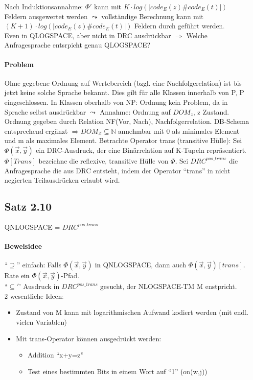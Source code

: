 \documentclass[12pt, a4paper]{article}
\begin{document}
Nach Induktionsannahme: $\Phi'$ kann mit $K \cdot log(|code_E(z)\#code_E(t)|)$ Feldern ausgewertet werden $\leadsto$ vollständige Berechnung kann mit $(K + 1) \cdot log(|code_E(z) \# code_E(t)|)$ Feldern durch geführt werden. \\

Even in QLOGSPACE, aber nicht in DRC ausdrückbar $\Rightarrow$ Welche Anfragesprache entsrpicht genau QLOGSPACE? \\

\paragraph{Problem} Ohne gegebene Ordnung auf Wertebereich (bzgl. eine Nachfolgerelation) ist bis jetzt keine solche Sprache bekannt. Dies gilt für alle Klassen innerhalb von P, P eingeschlossen. In Klassen oberhalb von NP: Ordnung kein Problem, da in Sprache selbst ausdrückbar $\leadsto$ Annahme: Ordnung auf $DOM_z$, z Zustand. \\

Ordnung gegeben durch Relation NF(Vor, Nach), Nachfolgerrelation. DB-Schema entsprechend ergänzt $\Rightarrow DOM_Z \subseteq \mathbb{N}$ annehmbar mit 0 als minimales Element und m als maximales Element. Betrachte Operator trans (transitive Hülle):
Sei $\Phi(\overset{\rightarrow}{x}, \overset{\rightarrow}{y}) $ ein DRC-Ausdruck, der eine Binärrelation auf K-Tupeln repräsentiert. $\Phi[Trans]$ bezeichne die reflexive, transitive Hülle von $\Phi$. Sei $DRC^{pos\_trans}$ die Anfragesprache die aus DRC entsteht, indem der Operator ``trans'' in nicht negierten Teilausdrücken erlaubt wird.

\subsection*{Satz 2.10}

QNLOGSPACE = $DRC^{pos\_trans}$

\paragraph{Beweisidee}

``$\supseteq$'' einfach: Falls $\Phi(\overset{\rightarrow}{x}, \overset{\rightarrow}{y})$ in QNLOGSPACE, dann auch  $\Phi(\overset{\rightarrow}{x}, \overset{\rightarrow}{y})[trans]$. Rate ein  $\Phi(\overset{\rightarrow}{x}, \overset{\rightarrow}{y})$-Pfad.\\

``$\subseteq'$' Ausdruck in $DRC^{pos\_trans}$ gesucht, der NLOGSPACE-TM M enstpricht. \\
2 wesentliche Ideen: 
\begin{itemize}
	\item Zustand von M kann mit logarithmischen Aufwand kodiert werden (mit endl. vielen Variablen)
	\item Mit trans-Operator können ausgedrückt werden:
	\begin{itemize}
		\item Addition ``x+y=z''
		\item Test eines bestimmten Bits in einem Wort auf ``1'' (on(w,j))
	\end{itemize}
\end{itemize}
\end{document}
